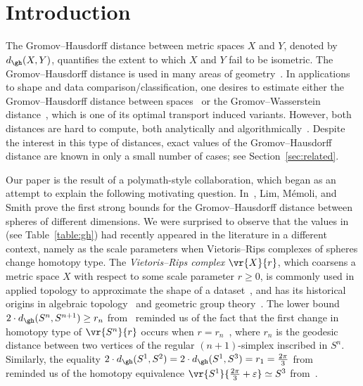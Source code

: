 \documentclass[11pt, reqno, english]{amsart}
\begin{document}



\section{Introduction}
\label{sec:intro}
The Gromov--Hausdorff distance between metric spaces $X$ and $Y$, denoted by $d_{\gh}(X,Y)$, quantifies the extent to which $X$ and $Y$ fail to be isometric.
The Gromov--Hausdorff distance is used in many areas of geometry~\cite{BuragoBuragoIvanov,cheeger1997structure,colding1996large,petersen2006riemannian}.
In applications to shape and data comparison/classification, one desires to estimate either the Gromov--Hausdorff distance between spaces~\cite{ms04,ms05,memoli2007use} or the Gromov--Wasserstein distance~\cite{memoli2011gromov,sturm2012space,peyre2019computational,alvarez2018gromov}, which is one of its optimal transport induced variants.
However, both distances are hard to compute, both analytically and algorithmically~\cite{memoli2012some,schmiedl2015shape,schmiedl2017computational,agarwal2018computing}.
Despite the interest in this type of distances, exact values of the Gromov--Hausdorff distance are known in only a small number of cases; see Section~\ref{sec:related}.

Our paper is the result of a polymath-style collaboration, which began as an attempt to explain the following motivating question. 
In~\cite{lim2021gromov}, Lim, M\'{e}moli, and Smith prove the first strong bounds for the Gromov--Hausdorff distance between spheres of different dimensions.
We were surprised to observe that the values in~\cite{lim2021gromov} (see Table~\ref{table:gh}) had recently appeared in the literature in a different context, namely as the scale parameters when Vietoris--Rips complexes of spheres change homotopy type.
The \emph{Vietoris--Rips complex} $\vr{X}{r}$, which coarsens a metric space $X$ with respect to some scale parameter $r \geq 0$, is commonly used in applied topology to approximate the shape of a dataset~\cite{Carlsson2009}, and has its historical origins in algebraic topology~\cite{Vietoris27} and geometric group theory~\cite{Gromov}.
The lower bound $2\cdot d_{\gh}(S^n,S^{n+1})\ge r_n$ from~\cite{lim2021gromov} reminded us of the fact that the first change in homotopy type of $\vr{S^n}{r}$ occurs when $r=r_n$~\cite{AAF,lim2020vietoris,katz1989diameter}, where $r_n$ is the geodesic distance between two vertices of the regular $(n+1)$-simplex inscribed in $S^n$.
Similarly, the equality $2\cdot d_{\gh}(S^1,S^2) = 2\cdot d_{\gh}(S^1,S^3)= r_1 = \frac{2\pi}{3}$ from~\cite{lim2021gromov} reminded us of the homotopy equivalence $\vr{S^1}{\frac{2\pi}{3}+\varepsilon}\simeq S^3$ from~\cite{AA-VRS1,ABF,moyVRmS1}. 
\end{document}
